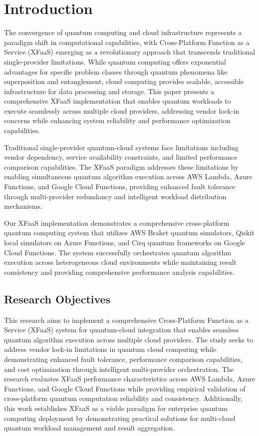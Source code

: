 \documentclass[onecolumn]{IEEEtran}
\begin{document}
\section{Introduction}

The convergence of quantum computing and cloud infrastructure represents a paradigm shift in computational capabilities, with Cross-Platform Function as a Service (XFaaS) emerging as a revolutionary approach that transcends traditional single-provider limitations. While quantum computing offers exponential advantages for specific problem classes through quantum phenomena like superposition and entanglement, cloud computing provides scalable, accessible infrastructure for data processing and storage. This paper presents a comprehensive XFaaS implementation that enables quantum workloads to execute seamlessly across multiple cloud providers, addressing vendor lock-in concerns while enhancing system reliability and performance optimization capabilities.

Traditional single-provider quantum-cloud systems face limitations including vendor dependency, service availability constraints, and limited performance comparison capabilities. The XFaaS paradigm addresses these limitations by enabling simultaneous quantum algorithm execution across AWS Lambda, Azure Functions, and Google Cloud Functions, providing enhanced fault tolerance through multi-provider redundancy and intelligent workload distribution mechanisms.

Our XFaaS implementation demonstrates a comprehensive cross-platform quantum computing system that utilizes AWS Braket quantum simulators, Qiskit local simulators on Azure Functions, and Cirq quantum frameworks on Google Cloud Functions. The system successfully orchestrates quantum algorithm execution across heterogeneous cloud environments while maintaining result consistency and providing comprehensive performance analysis capabilities.

\subsection{Research Objectives}
This research aims to implement a comprehensive Cross-Platform Function as a Service (XFaaS) system for quantum-cloud integration that enables seamless quantum algorithm execution across multiple cloud providers. The study seeks to address vendor lock-in limitations in quantum cloud computing while demonstrating enhanced fault tolerance, performance comparison capabilities, and cost optimization through intelligent multi-provider orchestration. The research evaluates XFaaS performance characteristics across AWS Lambda, Azure Functions, and Google Cloud Functions while providing empirical validation of cross-platform quantum computation reliability and consistency. Additionally, this work establishes XFaaS as a viable paradigm for enterprise quantum computing deployment by demonstrating practical solutions for multi-cloud quantum workload management and result aggregation.
\end{document}
